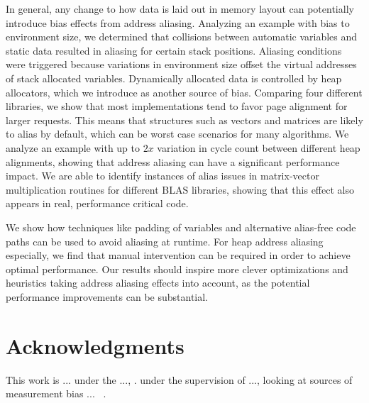 \documentclass[10pt, conference, compsocconf]{IEEEtran}
\begin{document}
In general, any change to how data is laid out in memory layout can potentially introduce bias effects from address aliasing.
Analyzing an example with bias to environment size, we determined that collisions between automatic variables and static data resulted in aliasing for certain stack positions.
Aliasing conditions were triggered because variations in environment size offset the virtual addresses of stack allocated variables.
Dynamically allocated data is controlled by heap allocators, which we introduce as another source of bias.
Comparing four different libraries, we show that most implementations tend to favor page alignment for larger requests.
This means that structures such as vectors and matrices are likely to alias by default, which can be worst case scenarios for many algorithms.
We analyze an example with up to $2x$ variation in cycle count between different heap alignments, showing that address aliasing can have a significant performance impact.
We are able to identify instances of alias issues in matrix-vector multiplication routines for different BLAS libraries, showing that this effect also appears in real, performance critical code.

We show how techniques like padding of variables and alternative alias-free code paths can be used to avoid aliasing at runtime.
For heap address aliasing especially, we find that manual intervention can be required in order to achieve optimal performance.
Our results should inspire more clever optimizations and heuristics taking address aliasing effects into account, as the potential performance improvements can be substantial.

\section{Acknowledgments}
\iffalse
This work is forked from a Master's thesis project under the supervision of Anne Cathrine Elster and Rune Erlend Jensen, looking at sources of measurement bias on the Intel ``Ivy Bridge'' microarchitecture~\cite{MasterThesis}.
\fi
This work is ... under the ..., .
 under the supervision of ..., looking at sources of measurement bias ... ~\cite{MasterThesis}.





\end{document}
